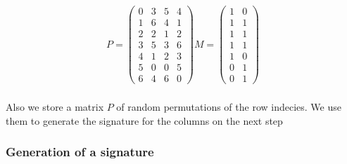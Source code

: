 \begin{equation}
    \begin{split}
        P = 
        \begin{pmatrix}
            0 & 3 & 5 & 4 \\
            1 & 6 & 4 & 1 \\
            2 & 2 & 1 & 2 \\
            3 & 5 & 3 & 6 \\
            4 & 1 & 2 & 3 \\
            5 & 0 & 0 & 5 \\
            6 & 4 & 6 & 0
        \end{pmatrix}
        M = 
        \begin{pmatrix}
            1 & 0 \\
            1 & 1 \\
            1 & 1 \\
            1 & 1 \\
            1 & 0 \\
            0 & 1 \\
            0 & 1
        \end{pmatrix}   
    \end{split}
\end{equation} \\

Also we store a matrix $ P $ of random permutations of the row indecies. We use them to generate the signature for the columns on the next step\\  



\subsubsection{Generation of a signature}





